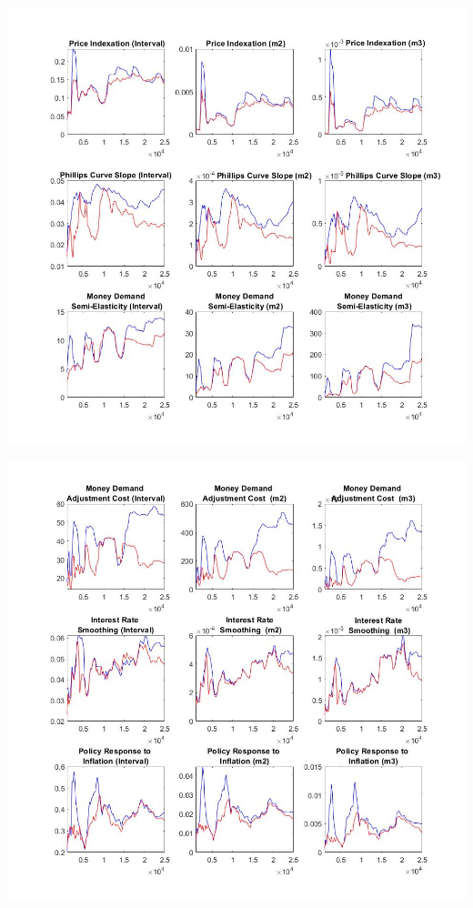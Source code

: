 \documentclass[11pt,preprint, authoryear]{elsarticle}
\let\origfigure\figure
\let\endorigfigure\endfigure
\renewenvironment{figure}[1][2] {
    \expandafter\origfigure\expandafter[H]
} {
    \endorigfigure
}
\numberwithin{equation}{section}
\numberwithin{figure}{section}
\numberwithin{table}{section}
\begin{document}
\begin{figure}
    \centering 
    \begin{minipage}[t]{8.2cm} 
        \centering 
        \includegraphics[width=\linewidth]{mctay3.jpg} 
    \end{minipage} 
    \hspace{0.1cm} 
    \begin{minipage}[t]{8.2cm} 
        \centering 
        \includegraphics[width=\linewidth]{mctay4.jpg} 
    \end{minipage}
    \caption{(b) MCMC - Taylor Rule}
    \label{mctay34}
\end{figure}
\end{document}
